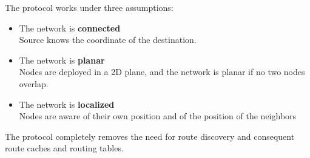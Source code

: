 The protocol works under three assumptions:
\begin{itemize}
   \item The network is \textbf{connected}\\
   Source knows the coordinate of the destination.
   \item The network is \textbf{planar}\\
   Nodes are deployed in a 2D plane, and the network is planar if no two nodes overlap.
   \item The network is \textbf{localized}\\
   Nodes are aware of their own position and of the position of the neighbors
\end{itemize}
The protocol completely removes the need for route discovery and consequent route caches and routing tables.

